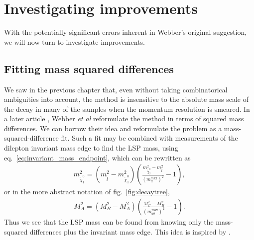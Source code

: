 \documentclass[twoside,english]{uiofysmaster}
\begin{document}
\chapter{Investigating improvements}%
With the potentially significant errors inherent in Webber's original suggestion, we will now turn to investigate improvements.


\section{Fitting mass squared differences}
We saw in the previous chapter that, even without taking combinatorical ambiguities into account, the method is insensitive to the absolute mass scale of the decay in many of the samples when the momentum resolution is smeared. In a later article \cite{Nojiri:2010dk}, Webber {\it et al} reformulate the method in terms of squared mass differences. We can borrow their idea and reformulate the problem as a mass-squared-difference fit. Such a fit may be combined with measurements of the dilepton invariant mass edge to find the LSP mass, using eq.\ \eqref{eq:invariant_mass_endpoint}, which can be rewritten as
\begin{align}
	m^2_{\tilde\chi_1^0} = (m^2_{\tilde l} - m^2_{\tilde \chi_1^0})\left(\frac{m^2_{\tilde\chi_2^0} - m^2_{\tilde l}}{(m_{ll}^\mathrm{max})^2} - 1\right),
\end{align}
or in the more abstract notation of fig.\ \ref{fig:decaytree},
\begin{align}
	M^2_A = (M^2_B - M^2_A)\left(\frac{M^2_C - M^2_B}{(m_{ab}^\mathrm{max})^2} - 1\right).\label{eq:MLSP_dilepton_edge}
\end{align}
Thus we see that the LSP mass can be found from knowing only the mass-squared differences plus the invariant mass edge. This idea is inspired by \cite{Cheng:2009fw}.
\end{document}
